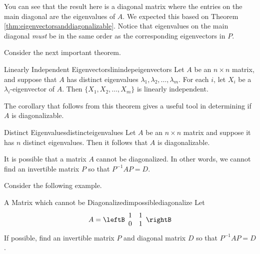 \begin{solution}
You can see that the result here is a diagonal matrix where the entries on the main diagonal are the eigenvalues of $A$. We expected this based on 
Theorem \ref{thm:eigenvectorsanddiagonalizable}. Notice that eigenvalues on the main diagonal {\em must\em} be in the same order as the corresponding eigenvectors in $P$. 
\end{solution}

Consider the next important theorem.

\begin{theorem}{Linearly Independent Eigenvectors}{linindepeigenvectors}
Let $A$ be an $n\times n$ matrix, and suppose that $A$ 
has distinct eigenvalues $\lambda_1, \lambda_2, \ldots, \lambda_m$.
For each $i$, let $X_i$ be a $\lambda_i$-eigenvector of $A$.
Then $\{ X_1, X_2, \ldots, X_m\}$ is 
linearly independent.
\end{theorem}

The corollary that follows from this theorem gives a useful tool in determining if $A$ is diagonalizable. 

\begin{corollary}{Distinct Eigenvalues}{distincteigenvalues}
Let $A$ be an $n \times n$ matrix and suppose it has $n$ distinct eigenvalues. Then it follows that $A$ is diagonalizable.
\end{corollary}

It is possible that a matrix $A$ cannot be diagonalized. In other words, we cannot find an invertible matrix $P$ so that $P^{-1}AP=D$.

Consider the following example. 

\begin{example}{A Matrix which cannot be Diagonalized}{impossiblediagonalize}
Let
\begin{equation*}
A = 
\leftB
\begin{array}{rr}
1 & 1 \\
0 & 1
\end{array}
\rightB
\end{equation*}
If possible, find an invertible matrix $P$ and diagonal matrix $D$ so that $P^{-1}AP=D$.
\end{example}

